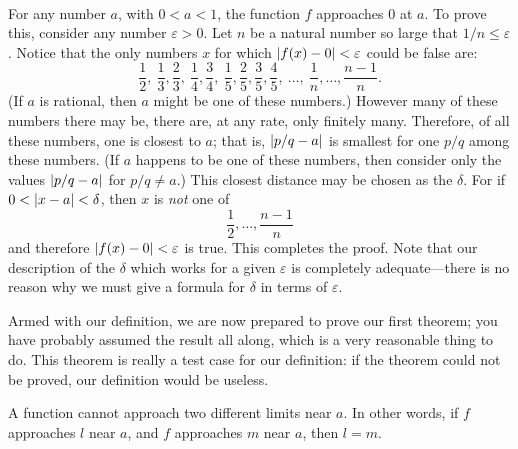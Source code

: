 \begin{center}
\\[0.6em]
\end{center}
For any number $a$, with $0<a<1$, the function $f$ approaches $0$ at $a$. To
prove this, consider any number $\varepsilon>0$. Let $n$ be a natural number
so large that $1/n\leq\varepsilon$. Notice that the only numbers $x$ for which
$\lvert f(x)-0\rvert<\varepsilon$ could be false are:
\[
\frac{1}{2},\
\frac{1}{3},\frac{2}{3},\
\frac{1}{4},\frac{3}{4},\
\frac{1}{5},\frac{2}{5},\frac{3}{5},\frac{4}{5},\
\ldots,\
\frac{1}{n},\ldots,\frac{n-1}{n}.
\]
(If $a$ is rational, then $a$ might be one of these numbers.) However many of
these numbers there may be, there are, at any rate, only finitely many.
Therefore, of all these numbers, one is closest to $a$; that is,
$\lvert p/q-a\rvert$ is smallest for one $p/q$ among these numbers. (If $a$ happens
to be one of these numbers, then consider only the values $\lvert p/q-a\rvert$ for
$p/q\neq a$.) This closest distance may be chosen as the $\delta$. For if
$0<\lvert x-a\rvert<\delta$, then $x$ is \emph{not} one of
\[
\frac{1}{2},\ldots,\frac{n-1}{n}
\]
and therefore $\lvert f(x)-0\rvert<\varepsilon$ is true. This completes the proof.
Note that our description of the $\delta$ which works for a given
$\varepsilon$ is completely adequate---there is no reason why we must give a
formula for $\delta$ in terms of $\varepsilon$.

Armed with our definition, we are now prepared to prove our first theorem; you
have probably assumed the result all along, which is a very reasonable thing
to do. This theorem is really a test case for our definition: if the theorem
could not be proved, our definition would be useless.

\begin{theorem}
A function cannot approach two different limits near $a$. In other words, if
$f$ approaches $l$ near $a$, and $f$ approaches $m$ near $a$, then $l=m$.
\end{theorem}

